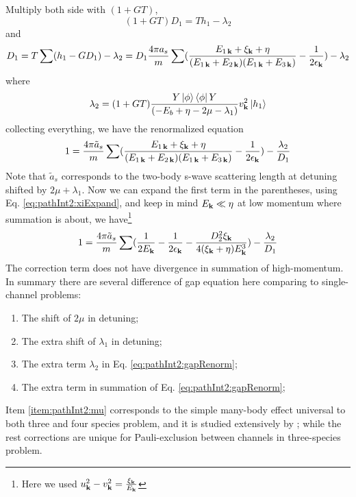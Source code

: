 Multiply both side with $(1+GT)$, 
\begin{equation*}
(1+GT)D_{1}=Th_{1}-\lambda_{2}
\end{equation*}
and 
\begin{equation}
D_{1}=T\sum(h_{1}-GD_{1})-\lambda_{2}
=D_{1}\frac{4\pi{a_{s}}}{m}\sum(\frac{E_{1\,\mathbf{k}}+\xi_{\mathbf{k}}+\eta}{(E_{1\,\mathbf{k}}+E_{2\,\mathbf{k}})(E_{1\,\mathbf{k}}+E_{3\,\mathbf{k}})}-\frac{1}{2\epsilon_{\mathbf{k}}})
	-\lambda_{2}
\end{equation}
where 
\begin{equation}\label{eq:pathInt2:lambda2}
\lambda_{2}=(1+GT)\frac{Y\left|\phi\right>\left<\phi\right|{Y}}{\left(-E_{b}+\eta-2\mu-\lambda_{1}\right)}v_{\mathbf{k}}^{2}\left|{h_{1}}\right>
\end{equation}
collecting everything, we have the renormalized equation
\begin{equation}
1=\frac{4\pi{\tilde{a}_{s}}}{m}\sum(\frac{E_{1\,\mathbf{k}}+\xi_{\mathbf{k}}+\eta}{(E_{1\,\mathbf{k}}+E_{2\,\mathbf{k}})(E_{1\,\mathbf{k}}+E_{3\,\mathbf{k}})}-\frac{1}{2\epsilon_{\mathbf{k}}})
	-\frac{\lambda_{2}}{D_{1}}
\end{equation}
Note that $\tilde{a}_{s}$ corresponds to the two-body s-wave scattering length at detuning shifted by $2\mu+\lambda_{1}$.
Now we can expand the first term in the parentheses, using Eq. \ref{eq:pathInt2:xiExpand}, and keep in mind $E_{\mathbf{k}}\ll{\eta}$ at low momentum where summation is about, we have\footnote{Here we used $u_{\mathbf{k}}^{2}-v_{\mathbf{k}}^{2}=\frac{\xi_{\mathbf{k}}}{E_{\mathbf{k}}}$}
\begin{equation}\label{eq:pathInt2:gapRenorm}
1=\frac{4\pi{\tilde{a}_{s}}}{m}\sum(\frac{1}{2E_{\mathbf{k}}}-\frac{1}{2\epsilon_{\mathbf{k}}}-\frac{D_{2}^{2}\xi_{\mathbf{k}}}{4(\xi_{\mathbf{k}}+\eta){E_{\mathbf{k}}^{3}}})
	-\frac{\lambda_{2}}{D_{1}}
\end{equation}
The correction term does not have divergence in summation of high-momentum. 
In summary there are several difference of gap equation here comparing to single-channel problems:
\begin{enumerate}
\item\label{item:pathInt2:mu}The shift of $2\mu$ in detuning;
\item The extra shift of $\lambda_{1}$ in detuning;
\item The extra term $\lambda_{2}$ in Eq. \ref{eq:pathInt2:gapRenorm};
\item The extra term  in summation of Eq. \ref{eq:pathInt2:gapRenorm};
\end{enumerate}
Item \ref{item:pathInt2:mu} corresponds to the simple many-body effect  universal to both three and four species problem, and it is studied extensively by \cite{GurarieNarrow}; while the rest corrections are unique for Pauli-exclusion between channels in three-species problem.

